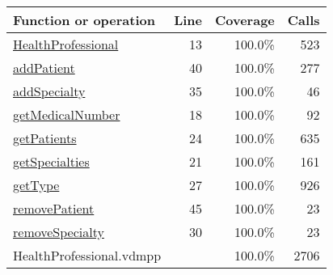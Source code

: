 \begin{longtable}{|l|r|r|r|}
\hline
Function or operation & Line & Coverage & Calls \\
\hline
\hline
\hyperref[HealthProfessional:13]{HealthProfessional} & 13&100.0\% & 523 \\
\hline
\hyperref[addPatient:40]{addPatient} & 40&100.0\% & 277 \\
\hline
\hyperref[addSpecialty:35]{addSpecialty} & 35&100.0\% & 46 \\
\hline
\hyperref[getMedicalNumber:18]{getMedicalNumber} & 18&100.0\% & 92 \\
\hline
\hyperref[getPatients:24]{getPatients} & 24&100.0\% & 635 \\
\hline
\hyperref[getSpecialties:21]{getSpecialties} & 21&100.0\% & 161 \\
\hline
\hyperref[getType:27]{getType} & 27&100.0\% & 926 \\
\hline
\hyperref[removePatient:45]{removePatient} & 45&100.0\% & 23 \\
\hline
\hyperref[removeSpecialty:30]{removeSpecialty} & 30&100.0\% & 23 \\
\hline
\hline
HealthProfessional.vdmpp & & 100.0\% & 2706 \\
\hline
\end{longtable}

